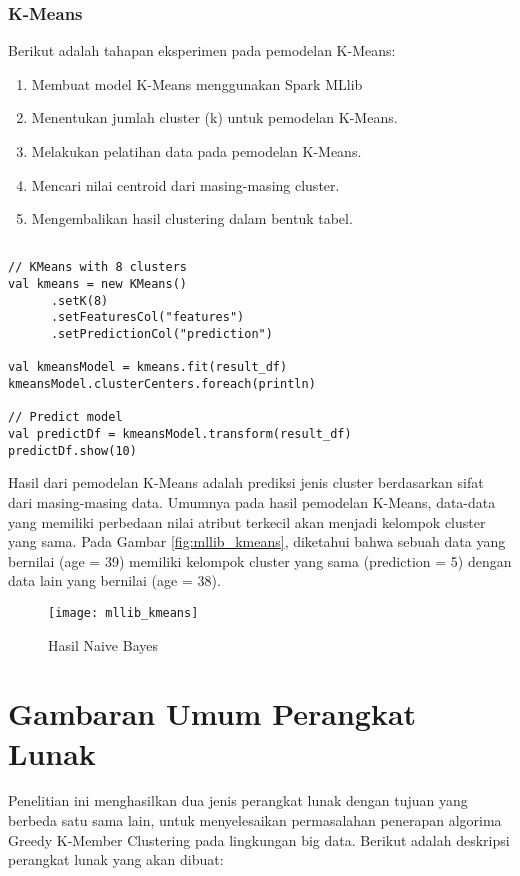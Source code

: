 \subsubsection{K-Means}
\noindent Berikut adalah tahapan eksperimen pada pemodelan K-Means:
\begin{enumerate}
\item Membuat model K-Means menggunakan Spark MLlib
\item Menentukan jumlah cluster (k) untuk pemodelan K-Means.
\item Melakukan pelatihan data pada pemodelan K-Means.
\item Mencari nilai centroid dari masing-masing cluster.
\item Mengembalikan hasil clustering dalam bentuk tabel.

\end{enumerate}	
\begin{lstlisting}[basicstyle=\ttfamily, frame=single,
	columns=fullflexible, keepspaces=true, breaklines=true, label=ls_kepatuhan_1_1_1_logo_sharif_judge, caption=Main method]
	
// KMeans with 8 clusters
val kmeans = new KMeans()
      .setK(8)
      .setFeaturesCol("features")
      .setPredictionCol("prediction")

val kmeansModel = kmeans.fit(result_df)
kmeansModel.clusterCenters.foreach(println)

// Predict model
val predictDf = kmeansModel.transform(result_df)
predictDf.show(10)

\end{lstlisting}

\vspace{0.5cm}
\noindent Hasil dari pemodelan K-Means adalah prediksi jenis cluster berdasarkan sifat dari masing-masing data. Umumnya pada hasil pemodelan K-Means, data-data yang memiliki perbedaan nilai atribut terkecil akan menjadi kelompok cluster yang sama. Pada Gambar \ref{fig:mllib_kmeans}, diketahui bahwa sebuah data yang bernilai (age = 39) memiliki kelompok cluster yang sama (prediction = 5) dengan data lain yang bernilai (age = 38).

\begin{figure}[H]
	\centering
	\texttt{[image: mllib\_kmeans]}
	\caption{Hasil Naive Bayes}
	\label{fig:mllib_naivebayes}
\end{figure}

\section{Gambaran Umum Perangkat Lunak}
Penelitian ini menghasilkan dua jenis perangkat lunak dengan tujuan yang berbeda satu sama lain, untuk menyelesaikan permasalahan penerapan algorima Greedy K-Member Clustering pada lingkungan big data. Berikut adalah deskripsi perangkat lunak yang akan dibuat:

